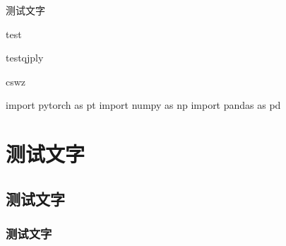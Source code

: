 \begin{Quiz}
\begin{NumberedItem}
	\item 测试文字
	\item test
	\item testqjply
\end{NumberedItem}



\begin{Proof}
	\lipsum[1]
	\tcblower
	\lipsum
\end{Proof}

\begin{Block}%
	\lipsum[1]
	\tcblower
	\lipsum
\end{Block}


\begin{Check}
	\lipsum[1-2]
	\tcbline
	\lipsum[1-2]
\end{Check}

\begin{Warning}
	\lipsum[2]
	\tcblower
	cswz
\end{Warning}



\begin{Vocabulary}
	\lipsum
\end{Vocabulary}



\Remark{\lipsum[2][1-3]}

\begin{PythonBox}[神经网络]
import pytorch as pt
import numpy as np
import pandas as pd
\end{PythonBox}

\end{Quiz}








\section{测试文字}

\makeatletter
{}
\makeatother
\lipsum



\subsection{测试文字}
\subsubsection{测试文字}


